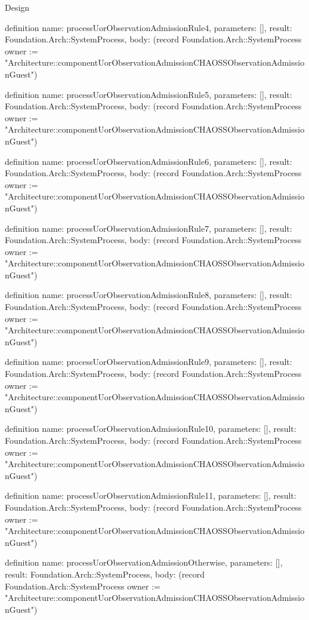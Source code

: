 \begin{lexlean}{Design}
\begin{semanticmodule}
definition{
  name: processUorObservationAdmissionRule4,
  parameters: [],
  result: Foundation.Arch::SystemProcess,
  body: (record Foundation.Arch::SystemProcess {owner := "Architecture::componentUorObservationAdmissionCHAOSSObservationAdmissionGuest"})
}

definition{
  name: processUorObservationAdmissionRule5,
  parameters: [],
  result: Foundation.Arch::SystemProcess,
  body: (record Foundation.Arch::SystemProcess {owner := "Architecture::componentUorObservationAdmissionCHAOSSObservationAdmissionGuest"})
}

definition{
  name: processUorObservationAdmissionRule6,
  parameters: [],
  result: Foundation.Arch::SystemProcess,
  body: (record Foundation.Arch::SystemProcess {owner := "Architecture::componentUorObservationAdmissionCHAOSSObservationAdmissionGuest"})
}

definition{
  name: processUorObservationAdmissionRule7,
  parameters: [],
  result: Foundation.Arch::SystemProcess,
  body: (record Foundation.Arch::SystemProcess {owner := "Architecture::componentUorObservationAdmissionCHAOSSObservationAdmissionGuest"})
}

definition{
  name: processUorObservationAdmissionRule8,
  parameters: [],
  result: Foundation.Arch::SystemProcess,
  body: (record Foundation.Arch::SystemProcess {owner := "Architecture::componentUorObservationAdmissionCHAOSSObservationAdmissionGuest"})
}

definition{
  name: processUorObservationAdmissionRule9,
  parameters: [],
  result: Foundation.Arch::SystemProcess,
  body: (record Foundation.Arch::SystemProcess {owner := "Architecture::componentUorObservationAdmissionCHAOSSObservationAdmissionGuest"})
}

definition{
  name: processUorObservationAdmissionRule10,
  parameters: [],
  result: Foundation.Arch::SystemProcess,
  body: (record Foundation.Arch::SystemProcess {owner := "Architecture::componentUorObservationAdmissionCHAOSSObservationAdmissionGuest"})
}

definition{
  name: processUorObservationAdmissionRule11,
  parameters: [],
  result: Foundation.Arch::SystemProcess,
  body: (record Foundation.Arch::SystemProcess {owner := "Architecture::componentUorObservationAdmissionCHAOSSObservationAdmissionGuest"})
}

definition{
  name: processUorObservationAdmissionOtherwise,
  parameters: [],
  result: Foundation.Arch::SystemProcess,
  body: (record Foundation.Arch::SystemProcess {owner := "Architecture::componentUorObservationAdmissionCHAOSSObservationAdmissionGuest"})
}


\end{semanticmodule}
\end{lexlean}

